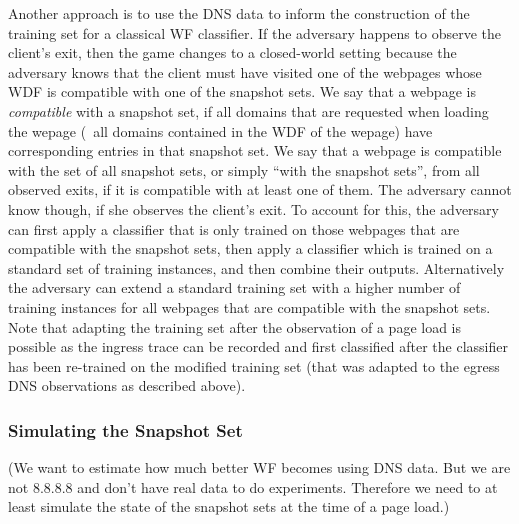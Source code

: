 Another approach is to use the DNS data to inform the construction of
the training set for a classical WF classifier.
%
If the adversary happens to observe the client's exit, then the game
changes to a closed-world setting because the adversary knows that the
client must have visited one of the webpages whose WDF is compatible
with one of the snapshot sets.
%
We say that a webpage is \emph{compatible} with a snapshot set, if all
domains that are requested when loading the wepage (\ie~all domains
contained in the WDF of the wepage) have corresponding entries in that
snapshot set. We say that a webpage is compatible with the set of all
snapshot sets, or simply ``with the snapshot sets'', from all observed
exits, if it is compatible with at least one of them. 
%
The adversary cannot know though, if she observes the client's exit. 
%
To account for this, the adversary can first apply a classifier that is
only trained on those webpages that are compatible with the snapshot
sets, then apply a classifier which is trained on a standard set of
training instances, and then combine their outputs.
%
Alternatively the adversary can extend a standard training set with a
higher number of training instances for all webpages that are compatible
with the snapshot sets.
%
Note that adapting the training set after the observation of a page load
is possible as the ingress trace can be recorded and first classified
after the classifier has been re-trained on the modified training set
(that was adapted to the egress DNS observations as described above).


\subsubsection{Simulating the Snapshot Set}
(We want to estimate how much better WF becomes using DNS data. But we
are not 8.8.8.8 and don't have real data to do experiments. Therefore we
need to at least simulate the state of the snapshot sets at the time of
a page load.) %
